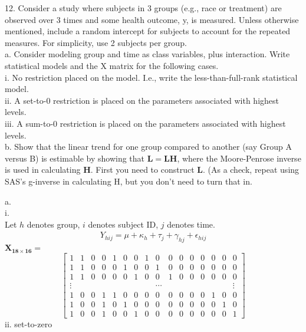\documentclass[12pt, utf8]{article}
\begin{document}
\begin{problem}
12. Consider a study where subjects in 3 groups (e.g., race or treatment) are observed over 3 times and some health outcome, y, is measured.  Unless otherwise mentioned, include a random intercept for subjects to account for the repeated measures.  For simplicity, use 2 subjects per group. \\
a. Consider modeling group and time as class variables, plus interaction.  Write statistical models and the X matrix for the following cases. \\
  i. No restriction placed on the model.  I.e., write the less-than-full-rank statistical model. \\
  ii. A set-to-0 restriction is placed on the parameters associated with highest levels. \\
  iii. A sum-to-0 restriction is placed on the parameters associated with highest levels. \\
b. Show that the linear trend for one group compared to another (say Group A versus B) is estimable by showing that $\boldsymbol{L=LH}$, where the Moore-Penrose inverse is used in calculating $\boldsymbol{H}$.  First you need to construct $\boldsymbol{L}$. (As a check, repeat using SAS’s g-inverse in calculating H, but you don’t need to turn that in.
\end{problem}
a.\\
i. \\
Let $h$ denotes group, $i$ denotes subject ID, $j$ denotes time. \\
\begin{align*}
Y_{hij} = \mu + \kappa_h + \tau_j + \gamma_{hj} + \epsilon_{hij}
\end{align*}
$\boldsymbol{X_{18 \times 16}} = $  
\[
\begin{bmatrix}
1 & 1 & 0 & 0 & 1 & 0 & 0 & 1 & 0 & 0 & 0 & 0 & 0 & 0 & 0 & 0\\
1 & 1 & 0 & 0 & 0 & 1 & 0 & 0 & 1 & 0 & 0 & 0 & 0 & 0 & 0 & 0\\
1 & 1 & 0 & 0 & 0 & 0 & 1 & 0 & 0 & 1 & 0 & 0 & 0 & 0 & 0 & 0\\
\vdots &  &  &  &  &  &  &  & \cdots &  &  &  &  &  & & \vdots\\
1 & 0 & 0 & 1 & 1 & 0 & 0 & 0 & 0 & 0 & 0 & 0 & 0 & 1 & 0 & 0\\
1 & 0 & 0 & 1 & 0 & 1 & 0 & 0 & 0 & 0 & 0 & 0 & 0 & 0 & 1 & 0\\
1 & 0 & 0 & 1 & 0 & 0 & 1 & 0 & 0 & 0 & 0 & 0 & 0 & 0 & 0 & 1
\end{bmatrix}
\]
ii. set-to-zero\\
\end{document}
